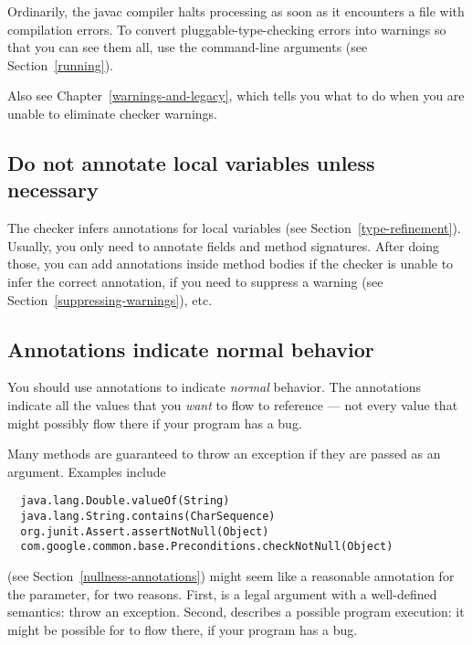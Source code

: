 Ordinarily, the javac compiler halts processing as soon as it encounters a
file with compilation errors.  To convert pluggable-type-checking errors
into warnings so that you can see them all, use the command-line arguments
 (see Section~\ref{running}).

Also see Chapter~\ref{warnings-and-legacy}, which tells you what to do when
you are unable to eliminate checker warnings.



\subsection{Do not annotate local variables unless necessary\label{tips-local-inference}}

The checker infers annotations for local variables (see
Section~\ref{type-refinement}).  Usually, you only need to annotate fields
and method signatures.  After doing those, you can add annotations inside
method bodies if the checker is unable to infer the correct annotation, if
you need to suppress a warning (see Section~\ref{suppressing-warnings}),
etc.


\subsection{Annotations indicate normal behavior\label{annotate-normal-behavior}}

You should use annotations to indicate \emph{normal} behavior.  The
annotations indicate all the values that you \emph{want} to flow to
reference --- not every value that might possibly flow there if your
program has a bug.

Many methods are guaranteed to throw an exception if they are passed 
as an argument.  Examples include

\begin{Verbatim}
  java.lang.Double.valueOf(String)
  java.lang.String.contains(CharSequence)
  org.junit.Assert.assertNotNull(Object)
  com.google.common.base.Preconditions.checkNotNull(Object)
\end{Verbatim}

 (see Section~\ref{nullness-annotations})
might seem like a reasonable annotation for the parameter,
for two reasons.  First,  is a legal argument with a
well-defined semantics:  throw an exception.  Second, 
describes a possible program execution:  it might be possible for
 to flow there, if your program has a bug.

